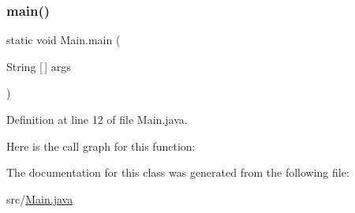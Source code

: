 \subsubsection{\texorpdfstring{main()}{main()}}
{\footnotesize\ttfamily static void Main.\+main (\begin{DoxyParamCaption}\item[{String \mbox{[}$\,$\mbox{]}}]{args }\end{DoxyParamCaption})\hspace{0.3cm}{\ttfamily [static]}}



Definition at line 12 of file Main.\+java.

Here is the call graph for this function\+:


The documentation for this class was generated from the following file\+:\begin{DoxyCompactItemize}
\item 
src/\hyperlink{_main_8java}{Main.\+java}\end{DoxyCompactItemize}
